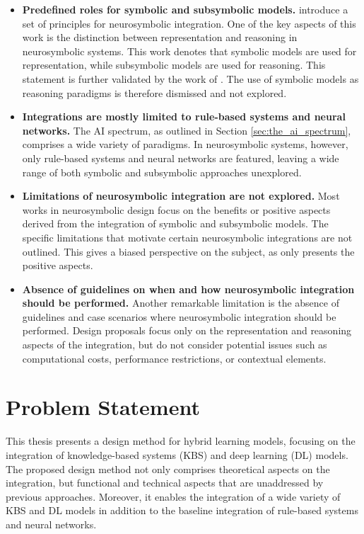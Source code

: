 \begin{itemize}
    \item \textbf{Predefined roles for symbolic and subsymbolic models.} \cite{besold_neural-symbolic_2017} introduce a set of principles for neurosymbolic integration. One of the key aspects of this work is the distinction between representation and reasoning in neurosymbolic systems. This work denotes that symbolic models are used for representation, while subsymbolic models are used for reasoning. This statement is further validated by the work of \cite{garcez_neural-symbolic_2019}. The use of symbolic models as reasoning paradigms is therefore dismissed and not explored.
    
    \item \textbf{Integrations are mostly limited to rule-based systems and neural networks.} The AI spectrum, as outlined in Section \ref{sec:the_ai_spectrum}, comprises a wide variety of paradigms. In neurosymbolic systems, however, only rule-based systems and neural networks are featured, leaving a wide range of both symbolic and subsymbolic approaches unexplored. 
    
    \item \textbf{Limitations of neurosymbolic integration are not explored.} Most works in neurosymbolic design focus on the benefits or positive aspects derived from the integration of symbolic and subsymbolic models. The specific limitations that motivate certain neurosymbolic integrations are not outlined. This gives a biased perspective on the subject, as only presents the positive aspects.
    
    \item \textbf{Absence of guidelines on when and how neurosymbolic integration should be performed.} Another remarkable limitation is the absence of guidelines and case scenarios where neurosymbolic integration should be performed. Design proposals focus only on the representation and reasoning aspects of the integration, but do not consider potential issues such as computational costs, performance restrictions, or contextual elements. 
\end{itemize}


\section{Problem Statement} \label{3_sec:problem_statement}
This thesis presents a design method for hybrid learning models, focusing on the integration of knowledge-based systems (KBS) and deep learning (DL) models. The proposed design method not only comprises theoretical aspects on the integration, but functional and technical aspects that are unaddressed by previous approaches.  Moreover, it enables the integration of a wide variety of KBS and DL models in addition to the baseline integration of rule-based systems and neural networks.  


